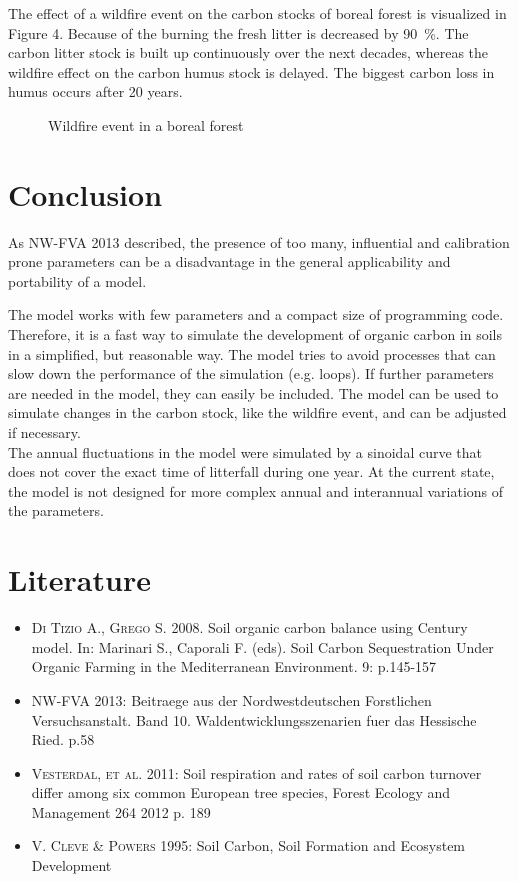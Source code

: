 \documentclass[10pt, a4paper]{article}
\begin{document}
The effect of a wildfire event on the carbon stocks of boreal forest is visualized in Figure 4. Because of the burning the fresh litter is decreased by \SI{90}{\%}. The carbon litter stock is built up continuously over the next decades, whereas the wildfire effect on the carbon humus stock is delayed. The biggest carbon loss in humus occurs after 20 years. 

\begin{figure}[!htbp]
	\centering
	\caption{Wildfire event in a boreal forest}
\end{figure}
\newpage
\section{Conclusion}

As \textsc{NW-FVA 2013} described, the presence of too many, influential and calibration prone parameters can be a disadvantage in the general applicability and portability of a model. 

The model works with few parameters and a compact size of programming code. Therefore, it is a fast way to simulate the development of organic carbon in soils in a simplified, but reasonable way. The model tries to avoid processes that can slow down the performance of the simulation (e.g. loops).
If further parameters are needed in the model, they can easily be included. The model can be used to simulate changes in the carbon stock, like the wildfire event, and can be adjusted if necessary. \\

The annual fluctuations in the model were simulated by a sinoidal curve that does not cover the exact time of litterfall during one year. At the current state, the model is not designed for more complex annual and interannual variations of the parameters.



\section{Literature}
\begin{itemize}
	\item\textsc{Di Tizio A., Grego S. 2008}. Soil organic carbon balance using Century model. In: Marinari S., Caporali F. (eds). Soil Carbon Sequestration Under Organic Farming in the Mediterranean Environment. 9: p.145-157
	
	\item\textsc{NW-FVA 2013}: Beitraege aus der Nordwestdeutschen Forstlichen Versuchsanstalt. Band 10. Waldentwicklungsszenarien fuer das Hessische Ried. p.58 
	\item\textsc{Vesterdal, et al.} 2011: Soil respiration and rates of soil carbon turnover differ among six common European tree species, Forest Ecology and Management 264 2012 p. 189
	\item \textsc{V. Cleve  \& Powers} 1995: Soil Carbon, Soil Formation and Ecosystem Development
\end{itemize}
\appendix
\end{document}
